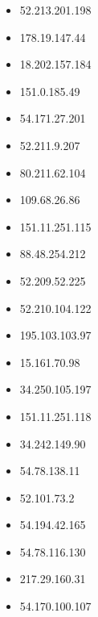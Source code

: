 \documentclass{article}
\begin{document}
\begin{itemize}
        \item 52.213.201.198
    
        \item 178.19.147.44
    
        \item 18.202.157.184
    
        \item 151.0.185.49
    
        \item 54.171.27.201
    
        \item 52.211.9.207
    
        \item 80.211.62.104
    
        \item 109.68.26.86
    
        \item 151.11.251.115
    
        \item 88.48.254.212
    
        \item 52.209.52.225
    
        \item 52.210.104.122
    
        \item 195.103.103.97
    
        \item 15.161.70.98
    
        \item 34.250.105.197
    
        \item 151.11.251.118
    
        \item 34.242.149.90
    
        \item 54.78.138.11
    
        \item 52.101.73.2
    
        \item 54.194.42.165
    
        \item 54.78.116.130
    
        \item 217.29.160.31
    
        \item 54.170.100.107
    

\end{itemize}
\end{document}
